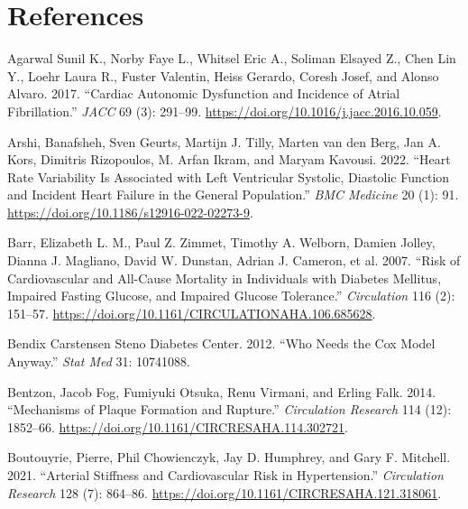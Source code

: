 \documentclass[
  a4paper,
  headsepline=true,
  open=any]{scrbook}
\newlength{\cslhangindent}
\newlength{\cslentryspacingunit} %
\newenvironment{CSLReferences}[2] %
 {%
  \setlength{\parindent}{0pt}
  \ifodd #1
  \let\oldpar\par
  \def\par{\hangindent=\cslhangindent\oldpar}
  \fi
  \setlength{\parskip}{#2\cslentryspacingunit}
 }%
 {}
\begin{document}

\hypertarget{references}{%
\chapter*{References}\label{references}}


\hypertarget{refs}{}
\begin{CSLReferences}{1}{0}
\leavevmode{}%
Agarwal Sunil K., Norby Faye L., Whitsel Eric A., Soliman Elsayed Z.,
Chen Lin Y., Loehr Laura R., Fuster Valentin, Heiss Gerardo, Coresh
Josef, and Alonso Alvaro. 2017. {``Cardiac Autonomic Dysfunction and
Incidence of Atrial Fibrillation.''} \emph{JACC} 69 (3): 291--99.
\url{https://doi.org/10.1016/j.jacc.2016.10.059}.

\leavevmode{}%
Arshi, Banafsheh, Sven Geurts, Martijn J. Tilly, Marten van den Berg,
Jan A. Kors, Dimitris Rizopoulos, M. Arfan Ikram, and Maryam Kavousi.
2022. {``Heart Rate Variability Is Associated with Left Ventricular
Systolic, Diastolic Function and Incident Heart Failure in the General
Population.''} \emph{BMC Medicine} 20 (1): 91.
\url{https://doi.org/10.1186/s12916-022-02273-9}.

\leavevmode{}%
Barr, Elizabeth L. M., Paul Z. Zimmet, Timothy A. Welborn, Damien
Jolley, Dianna J. Magliano, David W. Dunstan, Adrian J. Cameron, et al.
2007. {``Risk of Cardiovascular and All-Cause Mortality in Individuals
with Diabetes Mellitus, Impaired Fasting Glucose, and Impaired Glucose
Tolerance.''} \emph{Circulation} 116 (2): 151--57.
\url{https://doi.org/10.1161/CIRCULATIONAHA.106.685628}.

\leavevmode{}%
Bendix Carstensen Steno Diabetes Center. 2012. {``Who Needs the Cox
Model Anyway.''} \emph{Stat Med} 31: 10741088.

\leavevmode{}%
Bentzon, Jacob Fog, Fumiyuki Otsuka, Renu Virmani, and Erling Falk.
2014. {``Mechanisms of Plaque Formation and Rupture.''}
\emph{Circulation Research} 114 (12): 1852--66.
\url{https://doi.org/10.1161/CIRCRESAHA.114.302721}.

\leavevmode{}%
Boutouyrie, Pierre, Phil Chowienczyk, Jay D. Humphrey, and Gary F.
Mitchell. 2021. {``Arterial Stiffness and Cardiovascular Risk in
Hypertension.''} \emph{Circulation Research} 128 (7): 864--86.
\url{https://doi.org/10.1161/CIRCRESAHA.121.318061}.


\end{CSLReferences}
\end{document}
